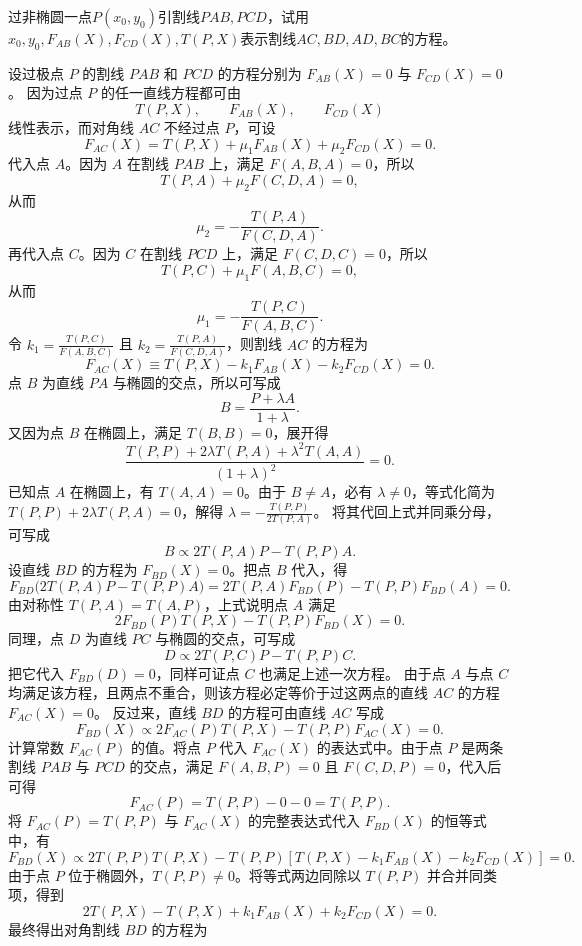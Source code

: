 \begin{exercise}
过非椭圆一点$P(x_0,y_0)$引割线$PAB,PCD$，试用$x_0,y_0,F_{AB}(X),F_{CD}(X),T(P,X)$表示割线$AC,BD,AD,BC$的方程。
\end{exercise}
\begin{solution}
设过极点 $P$ 的割线 $PAB$ 和 $PCD$ 的方程分别为 $F_{AB}(X) = 0$ 与 $F_{CD}(X) = 0$。
因为过点 $P$ 的任一直线方程都可由
\[
T(P,X),\qquad F_{AB}(X),\qquad F_{CD}(X)
\]
线性表示，而对角线 $AC$ 不经过点 $P$，可设
\[ F_{AC}(X) = T(P,X) + \mu_1 F_{AB}(X) + \mu_2 F_{CD}(X) = 0. \]
代入点 $A$。因为 $A$ 在割线 $PAB$ 上，满足 $F(A,B,A) = 0$，所以
\[
T(P,A) + \mu_2 F(C,D,A) = 0,
\]
从而
\[
\mu_2 = -\frac{T(P,A)}{F(C,D,A)}.
\]
再代入点 $C$。因为 $C$ 在割线 $PCD$ 上，满足 $F(C,D,C) = 0$，所以
\[
T(P,C) + \mu_1 F(A,B,C) = 0,
\]
从而
\[
\mu_1 = -\frac{T(P,C)}{F(A,B,C)}.
\]
令 $k_1 = \frac{T(P,C)}{F(A,B,C)}$ 且 $k_2 = \frac{T(P,A)}{F(C,D,A)}$，则割线 $AC$ 的方程为
\[ F_{AC}(X) \equiv T(P,X) - k_1 F_{AB}(X) - k_2 F_{CD}(X) = 0. \]
点 $B$ 为直线 $PA$ 与椭圆的交点，所以可写成
\[
B = \frac{P + \lambda A}{1+\lambda}.
\]
又因为点 $B$ 在椭圆上，满足 $T(B,B) = 0$，展开得
\[ \frac{T(P,P) + 2\lambda T(P,A) + \lambda^2 T(A,A)}{(1+\lambda)^2} = 0. \]
已知点 $A$ 在椭圆上，有 $T(A,A) = 0$。由于 $B \neq A$，必有 $\lambda \neq 0$，等式化简为 $T(P,P) + 2\lambda T(P,A) = 0$，解得 $\lambda = -\frac{T(P,P)}{2T(P,A)}$。
将其代回上式并同乘分母，可写成
\[
B \propto 2T(P,A)P - T(P,P)A.
\]
设直线 $BD$ 的方程为 $F_{BD}(X) = 0$。把点 $B$ 代入，得
\[ F_{BD}\big( 2T(P,A)P - T(P,P)A \big) = 2T(P,A)F_{BD}(P) - T(P,P)F_{BD}(A) = 0. \]
由对称性 $T(P,A)=T(A,P)$，上式说明点 $A$ 满足
\[ 2F_{BD}(P)T(P,X) - T(P,P)F_{BD}(X) = 0. \]
同理，点 $D$ 为直线 $PC$ 与椭圆的交点，可写成
\[
D \propto 2T(P,C)P - T(P,P)C.
\]
把它代入 $F_{BD}(D) = 0$，同样可证点 $C$ 也满足上述一次方程。
由于点 $A$ 与点 $C$ 均满足该方程，且两点不重合，则该方程必定等价于过这两点的直线 $AC$ 的方程 $F_{AC}(X) = 0$。
反过来，直线 $BD$ 的方程可由直线 $AC$ 写成
\[ F_{BD}(X) \propto 2F_{AC}(P)T(P,X) - T(P,P)F_{AC}(X) = 0. \]
    计算常数 $F_{AC}(P)$ 的值。将点 $P$ 代入 $F_{AC}(X)$ 的表达式中。由于点 $P$ 是两条割线 $PAB$ 与 $PCD$ 的交点，满足 $F(A,B,P) = 0$ 且 $F(C,D,P) = 0$，代入后可得
\[ F_{AC}(P) = T(P,P) - 0 - 0 = T(P,P). \]
将 $F_{AC}(P) = T(P,P)$ 与 $F_{AC}(X)$ 的完整表达式代入 $F_{BD}(X)$ 的恒等式中，有
\[ F_{BD}(X) \propto 2T(P,P)T(P,X) - T(P,P) \left[ T(P,X) - k_1 F_{AB}(X) - k_2 F_{CD}(X) \right] = 0. \]
由于点 $P$ 位于椭圆外，$T(P,P) \neq 0$。将等式两边同除以 $T(P,P)$ 并合并同类项，得到
\[ 2T(P,X) - T(P,X) + k_1 F_{AB}(X) + k_2 F_{CD}(X) = 0. \]
最终得出对角割线 $BD$ 的方程为

\end{solution}
